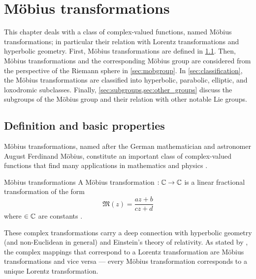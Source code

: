 \chapter{Möbius transformations}
\label{chap:moebius_transforms}
This chapter deals with a class of complex-valued functions, named Möbius transformations; in particular their relation with Lorentz transformations and hyperbolic geometry. First, Möbius transformations are defined in \cref{sec:moebius_def}. Then, Möbius transformations and the corresponding Möbius group are considered from the perspective of the Riemann sphere in \cref{sec:mobgroup}. In \cref{sec:classification}, the Möbius transformations are classified into hyperbolic, parabolic, elliptic, and loxodromic subclasses. Finally, \cref{sec:subgroups,sec:other_groups} discuss the subgroups of the Möbius group and their relation with other notable Lie groups.

\section{Definition and basic properties}
\label{sec:moebius_def}
Möbius transformations, named after the German mathematician and astronomer August Ferdinand Möbius, constitute an important class of complex-valued functions that find many applications in mathematics and physics \cite{Needham1997}.
\begin{thmblock}{Möbius transformations}
    A Möbius transformation $:\mathbb{C}\to\mathbb{C}$ is a linear fractional transformation of the form 
        \begin{equation}
            \mathfrak{M}(z) = \frac{az + b}{cz + d} \label{eq:mobius}
        \end{equation}
    where  \(\in \mathbb{C} \) are constants \cite{Needham1997}.
\end{thmblock}
These complex transformations carry a deep connection with hyperbolic geometry (and non-Euclidean in general) and Einstein's theory of relativity. As stated by \citet{Needham1997}, the complex mappings that correspond to a Lorentz transformation are Möbius transformations and vice versa --- every Möbius transformation corresponds to a unique Lorentz transformation.

